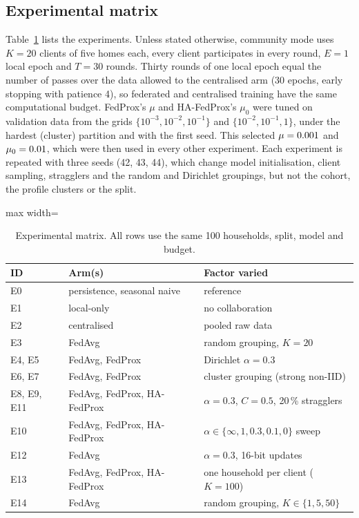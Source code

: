 \subsection{Experimental matrix}
Table~\ref{tab:matrix} lists the experiments. Unless stated otherwise, community mode uses $K=20$ clients of five
homes each, every client participates in every round, $E=1$ local epoch and $T=30$ rounds. Thirty rounds of one
local epoch equal the number of passes over the data allowed to the centralised arm (30 epochs, early stopping with
patience 4), so federated and centralised training have the same computational budget. FedProx's $\mu$ and
HA-FedProx's $\mu_0$ were tuned on validation data from the grids $\{10^{-3},10^{-2},10^{-1}\}$ and
$\{10^{-2},10^{-1},1\}$, under the hardest (cluster) partition and with the first seed. This selected $\mu=0.001{}$
and $\mu_0=0.01{}$, which were then used in every other experiment. Each experiment is repeated with three
seeds (42, 43, 44), which change model initialisation, client sampling, stragglers and the random and Dirichlet
groupings, but not the cohort, the profile clusters or the split.

\begin{table}[t]
\centering\small
\caption{Experimental matrix. All rows use the same 100 households, split, model and budget.}\label{tab:matrix}
\begin{adjustbox}{max width=\textwidth}
\begin{tabular}{lll}
\toprule
ID & Arm(s) & Factor varied \\
\midrule
E0 & persistence, seasonal naive & reference \\
E1 & local-only & no collaboration \\
E2 & centralised & pooled raw data \\
E3 & FedAvg & random grouping, $K=20$ \\
E4, E5 & FedAvg, FedProx & Dirichlet $\alpha=0.3$ \\
E6, E7 & FedAvg, FedProx & cluster grouping (strong non-IID) \\
E8, E9, E11 & FedAvg, FedProx, HA-FedProx & $\alpha=0.3$, $C=0.5$, 20\,\% stragglers \\
E10 & FedAvg, FedProx, HA-FedProx & $\alpha\in\{\infty,1,0.3,0.1,0\}$ sweep \\
E12 & FedAvg & $\alpha=0.3$, 16-bit updates \\
E13 & FedAvg, FedProx, HA-FedProx & one household per client ($K=100$) \\
E14 & FedAvg & random grouping, $K\in\{1,5,50\}$ \\
\bottomrule
\end{tabular}
\end{adjustbox}
\end{table}

